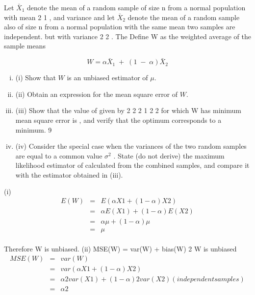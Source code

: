 \documentclass[a4paper,12pt]{article}
\begin{document}
 Let $\bar{X}_1$ denote the mean of a random sample of size n from a normal population with
mean
2
1 ,
and variance
and let $\bar{X}_2$ denote the mean of a random sample also of
size n from a normal population with the same mean
two samples are independent.
but with variance
2
2 .
The
Define W as the weighted average of the sample means

\[ W =\alpha {\bar{X}_1}  \;+\;(1\;-\;\alpha ){\bar{X}_2} \]


\begin{enumerate}[(i)]
\item (i) Show that $W$ is an unbiased estimator of $\mu$. 
\item (ii) Obtain an expression for the mean square error of $W$. 
\item (iii) Show that the value of
given by
2
2
2
1
2
2
for which W has minimum mean square error is
,
and verify that the optimum corresponds to a minimum.
9
\item 
(iv) Consider the special case when the variances of the two random samples are
equal to a common value $\sigma^2$ . State (do not derive) the maximum likelihood
estimator of calculated from the combined samples, and compare it with the
estimator obtained in (iii).
\end{enumerate}

(i)
\begin{eqnarray*}
E ( W ) &=& E ( \alpha X 1 + (1 − \alpha ) X 2 )\\
&=& \alpha E ( X 1 ) + (1 − \alpha ) E ( X 2 ) \\ &=& \alpha\mu  + (1 − \alpha ) \mu  \\ &=& \mu \\
\end{eqnarray*}

Therefore W is unbiased.
(ii)
MSE(W) = var(W) + {bias(W)} 2
W is unbiased
\begin{eqnarray*} 
MSE(W) &=& var(W)\\
&=& var( \alpha X 1 + (1 − \alpha ) X 2 )\\
&=& \alpha 2 var( X 1 ) + (1 − \alpha ) 2 var( X 2 ) (independent samples)\\
&=& \alpha 2
\end{eqnarray*}
\end{document}
